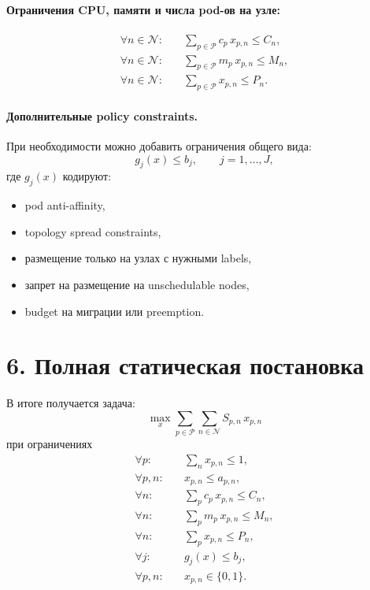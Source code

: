 \documentclass[11pt]{article}
\begin{document}
\paragraph{Ограничения CPU, памяти и числа pod-ов на узле:}
\begin{align*}
  \forall n\in\mathcal{N}:\quad
  &\sum_{p\in\mathcal{P}} c_p\, x_{p,n} \le C_n, \\
  \forall n\in\mathcal{N}:\quad
  &\sum_{p\in\mathcal{P}} m_p\, x_{p,n} \le M_n, \\
  \forall n\in\mathcal{N}:\quad
  &\sum_{p\in\mathcal{P}} x_{p,n} \le P_n.
\end{align*}

\paragraph{Дополнительные policy constraints.}
При необходимости можно добавить ограничения общего вида:
\[
  g_j(x) \le b_j,
  \qquad j=1,\dots,J,
\]
где \(g_j(x)\) кодируют:
\begin{itemize}
  \item pod anti-affinity,
  \item topology spread constraints,
  \item размещение только на узлах с нужными labels,
  \item запрет на размещение на unschedulable nodes,
  \item budget на миграции или preemption.
\end{itemize}

\section*{6. Полная статическая постановка}

В итоге получается задача:
\[
  \max_{x} \sum_{p\in\mathcal{P}} \sum_{n\in\mathcal{N}} S_{p,n}\, x_{p,n}
\]
при ограничениях
\begin{align*}
  \forall p:\quad &\sum_n x_{p,n} \le 1, \\
  \forall p,n:\quad &x_{p,n} \le a_{p,n}, \\
  \forall n:\quad &\sum_p c_p\,x_{p,n} \le C_n, \\
  \forall n:\quad &\sum_p m_p\,x_{p,n} \le M_n, \\
  \forall n:\quad &\sum_p x_{p,n} \le P_n, \\
  \forall j:\quad &g_j(x) \le b_j, \\
  \forall p,n:\quad &x_{p,n}\in\{0,1\}.
\end{align*}
\end{document}

